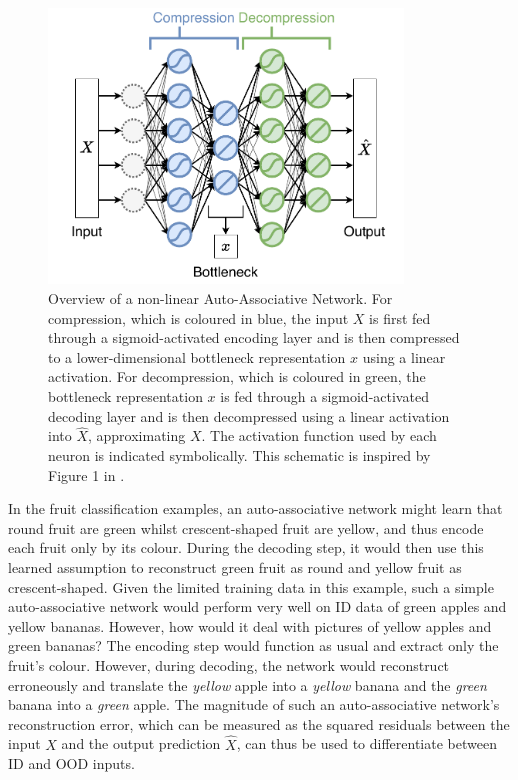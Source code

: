 \begin{figure}[ht]
    \centering
    \includegraphics[width=0.84\textwidth]{background/figures/auto-associative.pdf}
    \caption[Overview of an Auto-Associative Network]{Overview of a non-linear Auto-Associative Network. For compression, which is coloured in blue, the input $X$ is first fed through a sigmoid-activated encoding layer and is then compressed to a lower-dimensional bottleneck representation $x$ using a linear activation. For decompression, which is coloured in green, the bottleneck representation $x$ is fed through a sigmoid-activated decoding layer and is then decompressed using a linear activation into $\hat{X}$, approximating $X$. The activation function used by each neuron is indicated symbolically. This schematic is inspired by Figure 1 in \textcite{auto-associative-2001}.}
    \label{fig:auto-associative-overview}
\end{figure}

\noindent In the fruit classification examples, an auto-associative network might learn that round fruit are green whilst crescent-shaped fruit are yellow, and thus encode each fruit only by its colour. During the decoding step, it would then use this learned assumption to reconstruct green fruit as round and yellow fruit as crescent-shaped. Given the limited training data in this example, such a simple auto-associative network would perform very well on ID data of green apples and yellow bananas. However, how would it deal with pictures of yellow apples and green bananas? The encoding step would function as usual and extract only the fruit's colour. However, during decoding, the network would reconstruct erroneously and translate the \textit{yellow} apple into a \textit{yellow} banana and the \textit{green} banana into a \textit{green} apple. The magnitude of such an auto-associative network's reconstruction error, which can be measured as the squared residuals between the input $X$ and the output prediction $\hat{X}$, can thus be used to differentiate between ID and OOD inputs.

